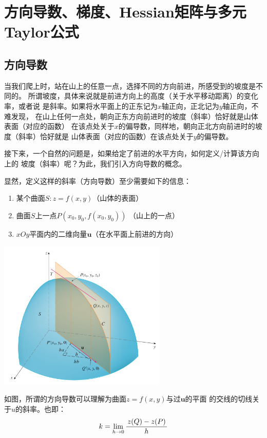 \section{方向导数、梯度、Hessian矩阵与多元Taylor公式}

\subsection{方向导数}

当我们爬上时，站在山上的任意一点，选择不同的方向前进，所感受到的坡度是不同的。
所谓坡度，具体来说就是前进方向上的高度（关于水平移动距离）的变化率，或者说
是斜率。如果将水平面上的正东记为$x$轴正向，正北记为$y$轴正向，不难发现，
在山上任何一点处，朝向正东方向前进时的坡度（斜率）恰好就是山体表面（对应的函数）
在该点处关于$x$的偏导数，同样地，朝向正北方向前进时的坡度（斜率）恰好就是
山体表面（对应的函数）在该点处关于$y$的偏导数。

接下来，一个自然的问题是，如果给定了前进的水平方向，如何定义/计算该方向上的
坡度（斜率）呢？为此，我们引入{\kaishu 方向导数}的概念。

% 
% 

显然，定义这样的斜率（方向导数）至少需要如下的信息：
\begin{enumerate}[(1)]
  \setlength{\itemindent}{1cm}
  \item 某个曲面$S:z=f(x,y)$（山体的表面） 
  \item 曲面$S$上一点$P(x_0,y_0,f(x_0,y_0))$ （山上的一点）
  \item $xOy$平面内的二维向量$\bm{u}$（在水平面上前进的方向）
\end{enumerate}
\begin{center}
	\includegraphics[width=0.6\textwidth]{./images/ch9/dd-1.png}
\end{center}
如图，所谓的方向导数可以理解为曲面$z=f(x,y)$与过$\bm{u}$的平面
的交线的切线关于$u$的斜率。也即： 
$$k=\lim\limits_{h\to 0}\displaystyle\frac{\,{z(Q)-z(P)}\,}{\,{h}\,}$$


